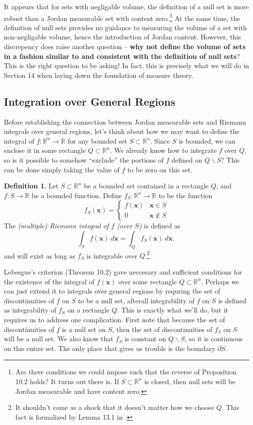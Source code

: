 \documentclass{article}
\newcommand{\R}{\mathbb{R}}
\newcommand{\x}{\mathbf{x}}
\theoremstyle{definition}
\newtheorem{definition}{Definition}[section]
\begin{document}
It appears that for sets with negligable volume, the definition of a null set is more robust than a Jordan measurable set with content zero.\footnote{Are there conditions we could impose such that the reverse of Proposition 10.2 holds? It turns out there is. If $S\subset \R^n$ is closed, then null sets will be Jordan measurable and have content zero.} At the same time, the definition of null sets provides no guidance to measuring the volume of a set with non-negligable volume, hence the introduction of Jordan content. However, this discrepency does raise another question -- \textbf{why not define the volume of sets in a fashion similar to and consistent with the definition of null sets}? This is the right question to be asking! In fact, this is precisely what we will do in Section 14 when laying down the foundation of measure theory.
	
\subsection{Integration over General Regions}

Before establishing the connection between Jordan measurable sets and Riemann integrals over general regions, let's think about how we may want to define the integral of $f:\R^n\to \R$ for any bounded set $S\subset \R^n$. Since $S$ is bounded, we can enclose it in some rectangle $Q\subset \R^n$. We already know how to integrate $f$ over $Q$, so is it possible to somehow ``exclude'' the portions of $f$ defined on $Q\backslash S$? This can be done simply taking the value of $f$ to be zero on this set.

\begin{definition}\label{def}
	Let $S\subset \R^n$ be a bounded set contained in a rectangle $Q$, and $f:S\to\R$ be a bounded function. Define $f_S:\R^n\to \R$ to be the function 
	$$ f_S(\x) = \begin{cases}
		f(\x) & \x\in S\\
		0 &\x\notin S
	\end{cases}$$ The  \textit{\color{red}(multiple) Riemann integral of $ f $ (over $ S$)} is defined as 
	$$ \int_S f(\x)\ d\x = \int_Q f_S(\x) \ d\x,$$ and will exist as long as $f_S$ is integrable over $Q$.\footnote{It shouldn't come as a shock that it doesn't matter how we choose $Q$. This fact is formalized by Lemma 13.1 in \cite{munk1}.}
\end{definition}
	
Lebesgue's criterion (Theorem 10.2) gave neccesary and sufficient conditions for the existence of the integral of $f(\x)$ over some rectangle $Q\subset \R^n$. Perhaps we can just extend it to integrals over general regions by requring the set of discontinuities of $f$ on $S$ to be a null set, afterall integrability of $f$ on $S$ is defined as integrability of $f_S$ on a rectangle $Q$. This is exactly what we'll do, but it requires us to address one complication. First note that because the set of discontinuities of $f$ is a null set on $S$, then the set of discontinuities of $f_S$ on $S$ will be a null set. We also know that $f_S$ is constant on $Q\backslash S$, so it is continuous on this entire set. The only place that gives us trouble is the boundary $\partial S$.
\end{document}
